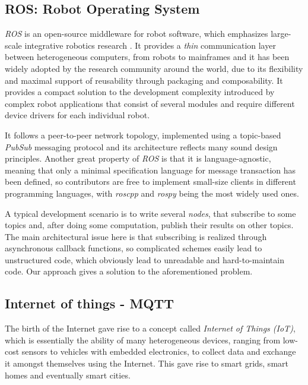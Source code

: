 \documentclass[sigplan,review,anonymous]{acmart}\settopmatter{printfolios=true,printacmref=false}
\begin{document}

\subsection{ROS: Robot Operating System}

\textit{ROS} is an open-source middleware for robot software, which emphasizes large-scale integrative robotics research \cite{ROS}. It provides a \textit{thin} communication layer between heterogeneous computers, from robots to mainframes and it has been widely adopted by the research community around the world, due to its flexibility and maximal support of reusability through packaging and composability. It provides a compact solution to the development complexity introduced by complex robot applications that consist of several modules and require different device drivers for each individual robot.

It follows a peer-to-peer network topology, implemented using a topic-based \textit{PubSub} messaging protocol and its architecture reflects many sound design principles. Another great property of \textit{ROS} is that it is language-agnostic, meaning that only a minimal specification language for message transaction has been defined, so contributors are free to implement small-size clients in different programming languages, with \textit{roscpp} and \textit{rospy} being the most widely used ones.

A typical development scenario is to write several \textit{nodes}, that subscribe to some topics and, after doing some computation, publish their results on other topics. The main architectural issue here is that subscribing is realized through asynchronous callback functions, so complicated schemes easily lead to unstructured code, which obviously lead to unreadable and hard-to-maintain code. Our approach gives a solution to the aforementioned problem.

\subsection{Internet of things - MQTT}

The birth of the Internet gave rise to a concept called \textit{Internet of Things (IoT)}, which is essentially the ability of many heterogeneous devices, ranging from low-cost sensors to vehicles with embedded electronics, to collect data and exchange it amongst themselves using the Internet. This gave rise to smart grids, smart homes and eventually smart cities.
\end{document}
